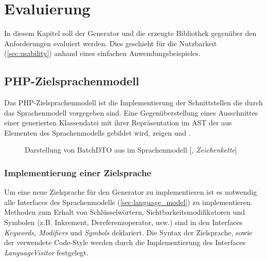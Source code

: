 \chapter{Evaluierung}
\label{chap:evaluation}


In diesem Kapitel soll der Generator und die erzeugte Bibliothek gegenüber den Anforderungen evaluiert werden. Dies geschieht für die Nutzbarkeit (\cref{sec:usability}) anhand eines einfachen Anwendungsbeispieles.

\section{PHP-Zielsprachenmodell}
\label{sec:php_target_language_model}

Das PHP-Zielsprachenmodell ist die Implementierung der Schnittstellen die durch das Sprachenmodell vorgegeben sind.
Eine Gegenüberstellung eines Ausschnittes einer generierten Klassendatei mit ihrer Repräsentation im \gls{AST} der aus Elementen des Sprachenmodells gebildet wird, zeigen  und .

\begin{sidewaysfigure}
    \centering
    \resizebox{\textwidth}{!}{
      
    }
    \caption{Darstellung von BatchDTO aus  im Sprachenmodell [, \emph{Zeichenkette}]}
    \label{fig:modelRepresentationOfBatchDTO}
\end{sidewaysfigure}

\subsection{Implementierung einer Zielsprache}
\label{sec:target_language_implementation}

Um eine neue Zielsprache für den Generator zu implementieren ist es notwendig alle Interfaces des Sprachenmodells (\cref{sec:language_model}) zu implementieren. Methoden zum Erhalt von Schlüsselwörtern, Sichtbarkeitsmodifikatoren und Symbolen (z.B. Inkrement, Dereferenzoperator, usw.) sind in den Interfaces \emph{Keywords, Modifiers} und \emph{Symbols} deklariert. Die Syntax der Zielsprache, sowie der verwendete Code-Style werden durch die Implementierung des Interfaces \emph{LanguageVisitor} festgelegt.

